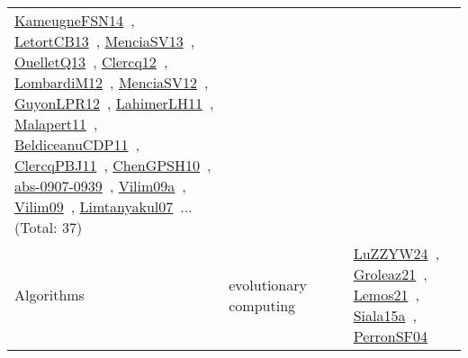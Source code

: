 {\begin{longtable}{lp{3cm}>{\raggedright\arraybackslash}p{6cm}>{\raggedright\arraybackslash}p{6cm}>{\raggedright\arraybackslash}p{8cm}}
\href{../works/KameugneFSN14.pdf}{KameugneFSN14}~\cite{KameugneFSN14}, \href{../works/LetortCB13.pdf}{LetortCB13}~\cite{LetortCB13}, \href{../works/MenciaSV13.pdf}{MenciaSV13}~\cite{MenciaSV13}, \href{../works/OuelletQ13.pdf}{OuelletQ13}~\cite{OuelletQ13}, \href{../works/Clercq12.pdf}{Clercq12}~\cite{Clercq12}, \href{../works/LombardiM12.pdf}{LombardiM12}~\cite{LombardiM12}, \href{../works/MenciaSV12.pdf}{MenciaSV12}~\cite{MenciaSV12}, \href{../works/GuyonLPR12.pdf}{GuyonLPR12}~\cite{GuyonLPR12}, \href{../works/LahimerLH11.pdf}{LahimerLH11}~\cite{LahimerLH11}, \href{../works/Malapert11.pdf}{Malapert11}~\cite{Malapert11}, \href{../works/BeldiceanuCDP11.pdf}{BeldiceanuCDP11}~\cite{BeldiceanuCDP11}, \href{../works/ClercqPBJ11.pdf}{ClercqPBJ11}~\cite{ClercqPBJ11}, \href{../works/ChenGPSH10.pdf}{ChenGPSH10}~\cite{ChenGPSH10}, \href{../works/abs-0907-0939.pdf}{abs-0907-0939}~\cite{abs-0907-0939}, \href{../works/Vilim09a.pdf}{Vilim09a}~\cite{Vilim09a}, \href{../works/Vilim09.pdf}{Vilim09}~\cite{Vilim09}, \href{../works/Limtanyakul07.pdf}{Limtanyakul07}~\cite{Limtanyakul07}... (Total: 37)\\
\index{evolutionary computing}\index{Algorithms!evolutionary computing}Algorithms & evolutionary computing &  &  & \href{../works/LuZZYW24.pdf}{LuZZYW24}~\cite{LuZZYW24}, \href{../works/Groleaz21.pdf}{Groleaz21}~\cite{Groleaz21}, \href{../works/Lemos21.pdf}{Lemos21}~\cite{Lemos21}, \href{../works/Siala15a.pdf}{Siala15a}~\cite{Siala15a}, \href{../works/PerronSF04.pdf}{PerronSF04}~\cite{PerronSF04}\\

\end{longtable}}
